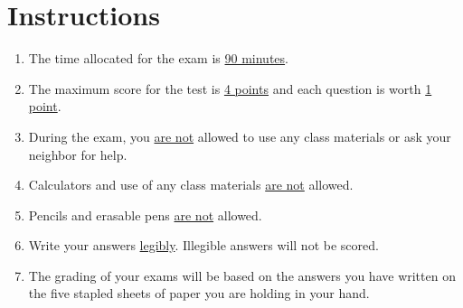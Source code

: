 \section*{Instructions}
\begin{enumerate}
    \item The time allocated for the exam is \underline{90 minutes}.
    \item The maximum score for the test is \underline{4 points} and each question is worth \underline{1 point}.
    \item During the exam, you \underline{are not} allowed to use any class materials or ask your neighbor for help.
    \item Calculators and use of any class materials \underline{are not} allowed.
    \item Pencils and erasable pens \underline{are not} allowed.
    \item Write your answers \underline{legibly}. Illegible answers will not be scored.
    \item The grading of your exams will be based on the answers you have written on the five stapled sheets of paper you are holding in your hand.
    \vfill
\end{enumerate}
